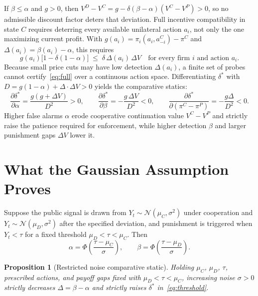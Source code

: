 \documentclass{article}
\newtheorem{proposition}{Proposition}
\begin{document}
If $\beta\leq\alpha$ and $g>0$, then $V^D-V^C=g-\delta(\beta-\alpha)(V^C-V^P)>0$, so no admissible discount factor deters that deviation. Full incentive compatibility in state $C$ requires deterring every available unilateral action $a_i$, not only the one maximizing current profit. With $g(a_i)=\pi_i(a_i,a_{-i}^C)-\pi^C$ and $\Delta(a_i)=\beta(a_i)-\alpha$, this requires
\begin{equation}\label{eq:full}
g(a_i)\bigl[1-\delta(1-\alpha)\bigr] \;\leq\;
\delta\,\Delta(a_i)\,\Delta V
\quad\text{for every firm } i \text{ and action } a_i.
\end{equation}
Because small price cuts may have low detection $\Delta(a_i)$, a finite set of probes cannot certify~\eqref{eq:full} over a continuous action space. Differentiating $\delta^*$ with $D=g(1-\alpha)+\Delta\cdot\Delta V > 0$ yields the comparative statics:
\begin{equation}\label{eq:compstat}
\frac{\partial\delta^*}{\partial\alpha}=\frac{g(g+\Delta V)}{D^2}>0,\qquad
\frac{\partial\delta^*}{\partial\beta}=-\frac{g\,\Delta V}{D^2}<0,\qquad
\frac{\partial\delta^*}{\partial(\pi^C-\pi^P)}=-\frac{g\Delta}{D^2}<0.
\end{equation}
Higher false alarms $\alpha$ erode cooperative continuation value $V^C-V^P$ and strictly raise the patience required for enforcement, while higher detection $\beta$ and larger punishment gaps $\Delta V$ lower it.

\section{What the Gaussian Assumption Proves}

Suppose the public signal is drawn from $Y_t\sim\mathcal{N}(\mu_C,\sigma^2)$ under cooperation and $Y_t\sim\mathcal{N}(\mu_D,\sigma^2)$ after the specified deviation, and punishment is triggered when $Y_t<\tau$ for a fixed threshold $\mu_D<\tau<\mu_C$. Then
\[
\alpha = \Phi\!\left(\frac{\tau-\mu_C}{\sigma}\right),\qquad
\beta  = \Phi\!\left(\frac{\tau-\mu_D}{\sigma}\right).
\]

\begin{proposition}[Restricted noise comparative static]\label{prop:gauss}
Holding $\mu_C$, $\mu_D$, $\tau$, prescribed actions, and payoff gaps fixed with $\mu_D<\tau<\mu_C$, increasing noise $\sigma>0$ strictly decreases $\Delta=\beta-\alpha$ and strictly raises $\delta^*$ in~\eqref{eq:threshold}.
\end{proposition}
\end{document}

